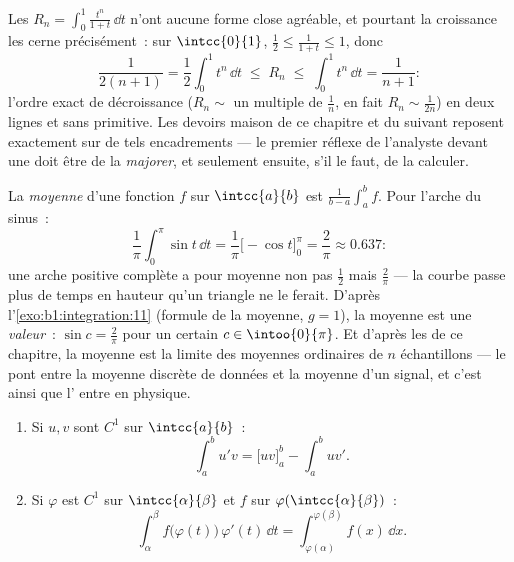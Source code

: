 \begin{example}\label{ex:b1:integration:estimate}
Les  $R_n = \int_0^1 \frac{t^n}{1 + t}\,\dd t$ n'ont
aucune forme close agréable, et pourtant la croissance les cerne
précisément~: sur $\intcc{0}{1}$, $\frac12 \leq \frac{1}{1+t} \leq
1$, donc
\[
\frac{1}{2(n+1)} = \frac12\int_0^1 t^n\,\dd t
\;\leq\; R_n \;\leq\; \int_0^1 t^n \,\dd t = \frac{1}{n+1} :
\]
l'ordre exact de décroissance ($R_n \sim$ un multiple de
$\frac1n$, en fait $R_n \sim \frac{1}{2n}$) en deux lignes et sans
primitive. Les devoirs maison de ce chapitre et du suivant
reposent exactement sur de tels encadrements --- le premier
réflexe de l'analyste devant une  doit être de la
\emph{majorer}, et seulement ensuite, s'il le faut, de la
calculer.
\end{example}

\begin{example}\label{ex:b1:integration:average}
La \emph{moyenne} d'une fonction  $f$ sur $\intcc{a}{b}$
est $\frac{1}{b-a}\int_a^b f$. Pour l'arche du sinus~:
\[
\frac{1}{\pi}\int_0^\pi \sin t\,\dd t
= \frac{1}{\pi}\bigl[-\cos t\bigr]_0^\pi = \frac{2}{\pi}
\approx 0.637 :
\]
une arche positive complète a pour moyenne non pas $\frac12$ mais
$\frac2\pi$ --- la courbe passe plus de temps en hauteur qu'un
triangle ne le ferait. D'après l'\cref{exo:b1:integration:11}
(formule de la moyenne, $g = 1$), la moyenne est une
\emph{valeur}~: $\sin c = \frac2\pi$ pour un certain $c \in
\intoo{0}{\pi}$. Et d'après les  de ce chapitre,
la moyenne est la limite des moyennes ordinaires de $n$
échantillons --- le pont entre la moyenne discrète de données et
la moyenne  d'un signal, et c'est ainsi que l'
entre en physique.
\end{example}

\begin{theorem}\label{thm:b1:integration:parts}
\begin{enumerate}
  \item Si $u, v$ sont $C^1$ sur $\intcc{a}{b}$~:
        \[
        \int_a^b u'v = \bigl[uv\bigr]_a^b - \int_a^b uv' .
        \]
  \item Si $\varphi$ est $C^1$ sur $\intcc{\alpha}{\beta}$ et $f$
         sur $\varphi(\intcc{\alpha}{\beta})$~:
        \[
        \int_{\alpha}^{\beta} f\bigl(\varphi(t)\bigr)\,\varphi'(t)\,
        \dd t = \int_{\varphi(\alpha)}^{\varphi(\beta)} f(x)\, \dd x .
        \]
\end{enumerate}
\end{theorem}

